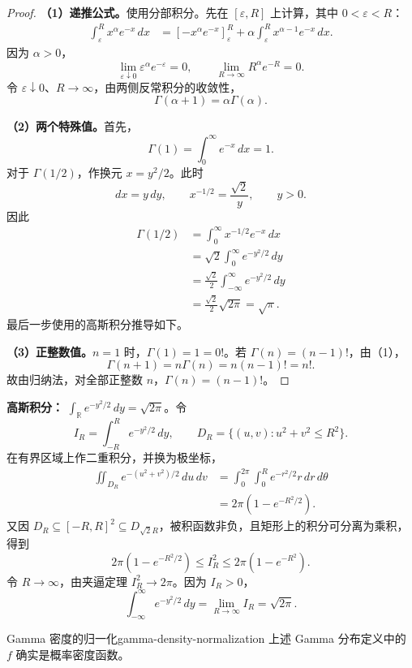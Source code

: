 \begin{proof}
\textbf{（1）递推公式。}\quad 使用分部积分。先在 $[\varepsilon,R]$ 上计算，其中 $0<\varepsilon<R$：
\[
\begin{aligned}
\int_\varepsilon^R x^\alpha e^{-x}\,dx
&=\left[-x^\alpha e^{-x}\right]_\varepsilon^R
+\alpha\int_\varepsilon^R x^{\alpha-1}e^{-x}\,dx.
\end{aligned}
\]
因为 $\alpha>0$，
\[
\lim_{\varepsilon\downarrow0}\varepsilon^\alpha e^{-\varepsilon}=0,
\qquad
\lim_{R\to\infty}R^\alpha e^{-R}=0.
\]
令 $\varepsilon\downarrow0$、$R\to\infty$，由两侧反常积分的收敛性，
\[
\Gamma(\alpha+1)=\alpha\Gamma(\alpha).
\]

\textbf{（2）两个特殊值。}\quad 首先，
\[
\Gamma(1)=\int_0^\infty e^{-x}\,dx=1.
\]
对于 $\Gamma(1/2)$，作换元 $x=y^2/2$。此时
\[
dx=y\,dy,\qquad x^{-1/2}=\frac{\sqrt2}{y},\qquad y>0.
\]
因此
\[
\begin{aligned}
\Gamma(1/2)
&=\int_0^\infty x^{-1/2}e^{-x}\,dx\\
&=\sqrt2\int_0^\infty e^{-y^2/2}\,dy\\
&=\frac{\sqrt2}{2}\int_{-\infty}^{\infty}e^{-y^2/2}\,dy\\
&=\frac{\sqrt2}{2}\sqrt{2\pi}=\sqrt\pi.
\end{aligned}
\]
最后一步使用的高斯积分推导如下。

\textbf{（3）正整数值。}\quad $n=1$ 时，$\Gamma(1)=1=0!$。若 $\Gamma(n)=(n-1)!$，由（1），
\[
\Gamma(n+1)=n\Gamma(n)=n(n-1)!=n!.
\]
故由归纳法，对全部正整数 $n$，$\Gamma(n)=(n-1)!$。
\end{proof}

\textbf{高斯积分：}\quad
$\int_{\mathbb R}e^{-y^2/2}\,dy=\sqrt{2\pi}$。令
\[
I_R=\int_{-R}^Re^{-y^2/2}\,dy,
\qquad
D_R=\{(u,v):u^2+v^2\leq R^2\}.
\]
在有界区域上作二重积分，并换为极坐标，
\[
\begin{aligned}
\iint_{D_R}e^{-(u^2+v^2)/2}\,du\,dv
&=\int_0^{2\pi}\int_0^R e^{-r^2/2}r\,dr\,d\theta\\
&=2\pi(1-e^{-R^2/2}).
\end{aligned}
\]
又因 $D_R\subseteq[-R,R]^2\subseteq D_{\sqrt2R}$，被积函数非负，且矩形上的积分可分离为乘积，得到
\[
2\pi(1-e^{-R^2/2})
\leq I_R^2
\leq2\pi(1-e^{-R^2}).
\]
令 $R\to\infty$，由夹逼定理 $I_R^2\to2\pi$。因为 $I_R>0$，
\[
\int_{-\infty}^{\infty}e^{-y^2/2}\,dy
=\lim_{R\to\infty}I_R=\sqrt{2\pi}.
\]

\begin{proposition}{Gamma 密度的归一化}{gamma-density-normalization}
上述 Gamma 分布定义中的 $f$ 确实是概率密度函数。
\end{proposition}

